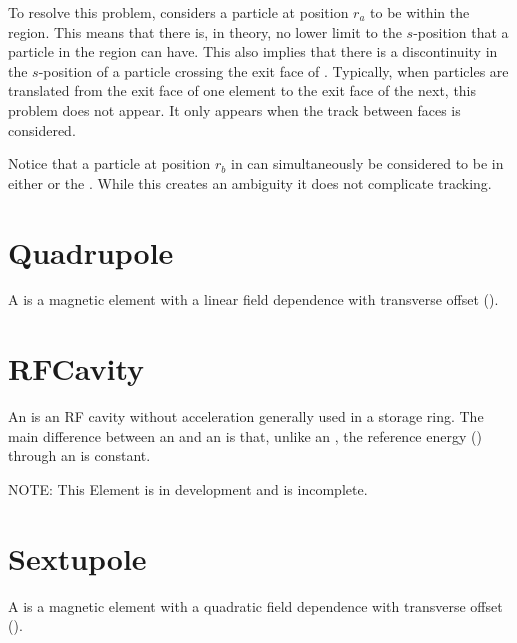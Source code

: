 To resolve this problem, \accellat considers a particle at position $r_a$ to be within the 
region. This means that there is, in theory, no lower limit to the $s$-position that a particle in
the  region can have. This also implies that there is a discontinuity in the $s$-position
of a particle crossing the exit face of . Typically, when particles are translated from the
exit face of one element to the exit face of the next, this  problem does not appear. It
only appears when the track between faces is considered.

Notice that a particle at position $r_b$ in  can simultaneously be considered to
be in either  or the . While this creates an ambiguity it does not complicate
tracking.

\section{Quadrupole}
\label{s:quadrupole}

A  is a magnetic element with a linear field dependence
with transverse offset ().


\section{RFCavity}
\label{s:rfcavity}

An  is an RF cavity without acceleration generally used in a storage ring. The main
difference between an  and an  is that, unlike an , the
reference energy () through an  is constant.

NOTE: This Element is in development and is incomplete.

\section{Sextupole}
\label{s:sextupole}

A  is a magnetic element with a quadratic field
dependence with transverse offset ().


